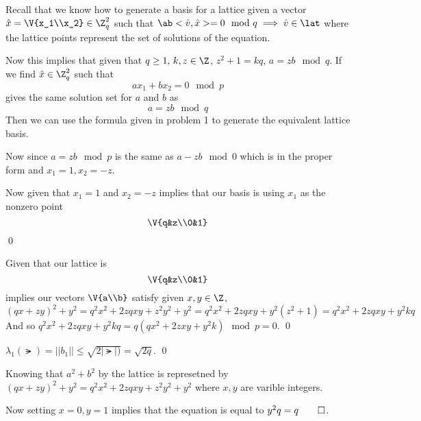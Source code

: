 \documentclass[12pt]{amsart}
\begin{document}
    \begin{problem}
    \begin{subproblem}
      Recall that we know how to generate a basis for a lattice given a vector $\hat x=\V{x_1\\x_2}\in\Z^2_q$ such that $\ab<\hat v,\hat x>=0\mod q \implies\hat v\in\lat $ where the lattice points represent the set of solutions of the equation.  

      Now this implies that given that $q\geq1,\, k,z\in\Z$, $z^2+1=kq$, $a=zb\mod q$. If we find $\hat x\in \Z^2_q$ such that 
      \[a x_1 + b x_2 = 0\mod p\]
      gives the same solution set for $a$ and $b$ as 
      \[a = zb \mod q\] 
      Then we can use the formula given in problem 1 to generate the equivalent lattice basis. 
      
      Now since $a=zb \mod p$ is the same as $a-zb\mod 0$ which is in the proper form and $x_1=1, x_2 = -z$. 

      Now given that $x_1 = 1$ and $x_2 = -z$ implies that our basis is using $x_1$ as the nonzero point 
      \[\V{q&z\\0&1}\]\qed  
    \end{subproblem} 
    \begin{subproblem}
      Given that our lattice is 
      \[\V{q&z\\0&1}\]
      implies our vectors $\V{a\\b}$ satisfy given $x,y\in \Z$, 
      \[(qx+zy)^2 + y^2 = q^2x^2+2zqxy+z^2y^2+y^2 = q^2x^2+2zqxy+y^2(z^2+1)=q^2x^2+2zqxy+y^2kq\]
      And so $q^2x^2+2zqxy+y^2kq = q(qx^2+2zxy+y^2k) \mod p = 0$. \qed
    \end{subproblem}
    \begin{subproblem}
      $\lambda_1(\lat) = ||b_1|| \leq \sqrt{2|\lat|)} = \sqrt{2q}$. \qed 
    \end{subproblem}
    \begin{subproblem}
      Knowing that $a^2+b^2$ by the lattice is represetned by $(qx+zy)^2 + y^2 = q^2x^2+2zqxy+z^2y^2+y^2$ where $x,y$ are varible integers.
     
      Now setting $x=0, y=1$ implies that the equation is equal to $y^2q = q\qed$. 
    \end{subproblem}
  \end{problem}
\end{document}
